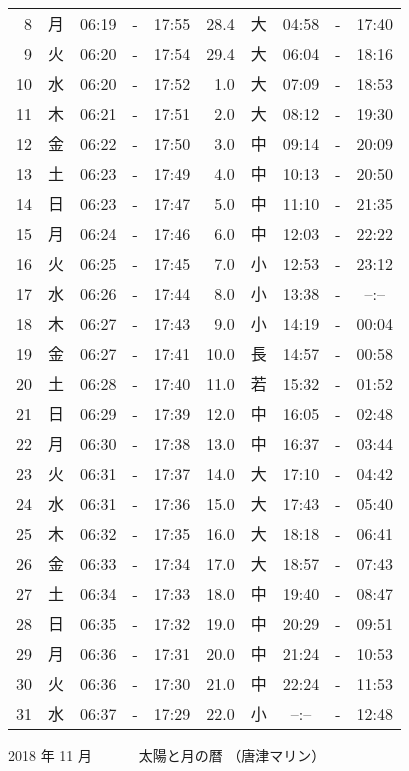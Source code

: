 \documentclass[a4j,10pt]{jsarticle}
\begin{document}
\begin{center}
\begin{table}[ht]
\begin{center}
\begin{tabular}{|rc|ccc|rc|ccc|}
  8 & 月 & 06:19 &-& 17:55 & 28.4 & 大 & 04:58 &-& 17:40 \\
  9 & 火 & 06:20 &-& 17:54 & 29.4 & 大 & 06:04 &-& 18:16 \\
 10 & 水 & 06:20 &-& 17:52 &  1.0 & 大 & 07:09 &-& 18:53 \\
 11 & 木 & 06:21 &-& 17:51 &  2.0 & 大 & 08:12 &-& 19:30 \\
 12 & 金 & 06:22 &-& 17:50 &  3.0 & 中 & 09:14 &-& 20:09 \\
 13 & 土 & 06:23 &-& 17:49 &  4.0 & 中 & 10:13 &-& 20:50 \\
 14 & 日 & 06:23 &-& 17:47 &  5.0 & 中 & 11:10 &-& 21:35 \\
 15 & 月 & 06:24 &-& 17:46 &  6.0 & 中 & 12:03 &-& 22:22 \\
 16 & 火 & 06:25 &-& 17:45 &  7.0 & 小 & 12:53 &-& 23:12 \\
 17 & 水 & 06:26 &-& 17:44 &  8.0 & 小 & 13:38 &-& --:-- \\
 18 & 木 & 06:27 &-& 17:43 &  9.0 & 小 & 14:19 &-& 00:04 \\
 19 & 金 & 06:27 &-& 17:41 & 10.0 & 長 & 14:57 &-& 00:58 \\
 20 & 土 & 06:28 &-& 17:40 & 11.0 & 若 & 15:32 &-& 01:52 \\
 21 & 日 & 06:29 &-& 17:39 & 12.0 & 中 & 16:05 &-& 02:48 \\
 22 & 月 & 06:30 &-& 17:38 & 13.0 & 中 & 16:37 &-& 03:44 \\
 23 & 火 & 06:31 &-& 17:37 & 14.0 & 大 & 17:10 &-& 04:42 \\
 24 & 水 & 06:31 &-& 17:36 & 15.0 & 大 & 17:43 &-& 05:40 \\
 25 & 木 & 06:32 &-& 17:35 & 16.0 & 大 & 18:18 &-& 06:41 \\
 26 & 金 & 06:33 &-& 17:34 & 17.0 & 大 & 18:57 &-& 07:43 \\
 27 & 土 & 06:34 &-& 17:33 & 18.0 & 中 & 19:40 &-& 08:47 \\
 28 & 日 & 06:35 &-& 17:32 & 19.0 & 中 & 20:29 &-& 09:51 \\
 29 & 月 & 06:36 &-& 17:31 & 20.0 & 中 & 21:24 &-& 10:53 \\
 30 & 火 & 06:36 &-& 17:30 & 21.0 & 中 & 22:24 &-& 11:53 \\
 31 & 水 & 06:37 &-& 17:29 & 22.0 & 小 & --:-- &-& 12:48 \\
\hline
\end{tabular}
\end{center}
\end{table}
\newpage
{\large 2018 年 11 月}
{\Large 　　　太陽と月の暦   （唐津マリン） }

\end{center}
\end{document}
